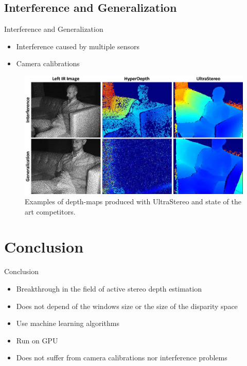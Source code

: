 \subsection{Interference and Generalization}

\begin{frame}{Interference and Generalization}
\begin{itemize}
\item Interference caused by multiple sensors
\item Camera calibrations
\end{itemize}
\begin{figure}
\includegraphics[scale=0.1]{pictures/fig8}
\caption{Examples of depth-maps produced with UltraStereo and state of the art competitors.}
\end{figure}
\end{frame}

\section{Conclusion}
\begin{frame}{Conclusion}
\begin{itemize}
\item Breakthrough in the field of active stereo depth estimation 
\item Does not depend of the windows size or the size of the disparity space
\item Use machine learning algorithms
\item Run on GPU
\item Does not suffer from camera calibrations nor interference problems
\end{itemize}
\end{frame}
